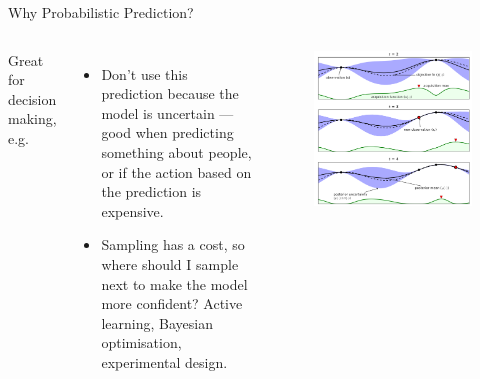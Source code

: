 \documentclass[lualatex, aspectratio=169]{beamer}
\begin{document}
\begin{frame}{Why Probabilistic Prediction?}

  \begin{columns}
    \column{0.5\pagewidth}
    Great for decision making, e.g.
    \begin{itemize}
      \item Don't use this prediction because the model is uncertain --- good when predicting something about people, or if the action based on the prediction is expensive.
      \item Sampling has a cost, so where should I sample next to make the model more confident? Active learning, Bayesian optimisation, experimental design.
    \end{itemize}
    \column{0.4\pagewidth}
    \begin{figure}
      \includegraphics[width=0.4\pagewidth]{assets/bayesopt.png}
    \end{figure}
  \end{columns}

\end{frame}
\end{document}
